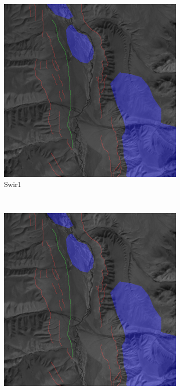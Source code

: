 \documentclass[11pt,a4paper]{article}
\begin{document}
\begin{figure}[t]
    \begin{subfigure}[b]{0.18\textwidth}
        \includegraphics[width=\textwidth]{graphics/data/0/features_swir1.png}
        \caption{Swir1}
        \label{fig:features_swir1}
    \end{subfigure}
    ~
    \begin{subfigure}[b]{0.18\textwidth}
        \includegraphics[width=\textwidth]{graphics/data/0/features_swir2.png}

\end{subfigure}
\end{figure}
\end{document}
